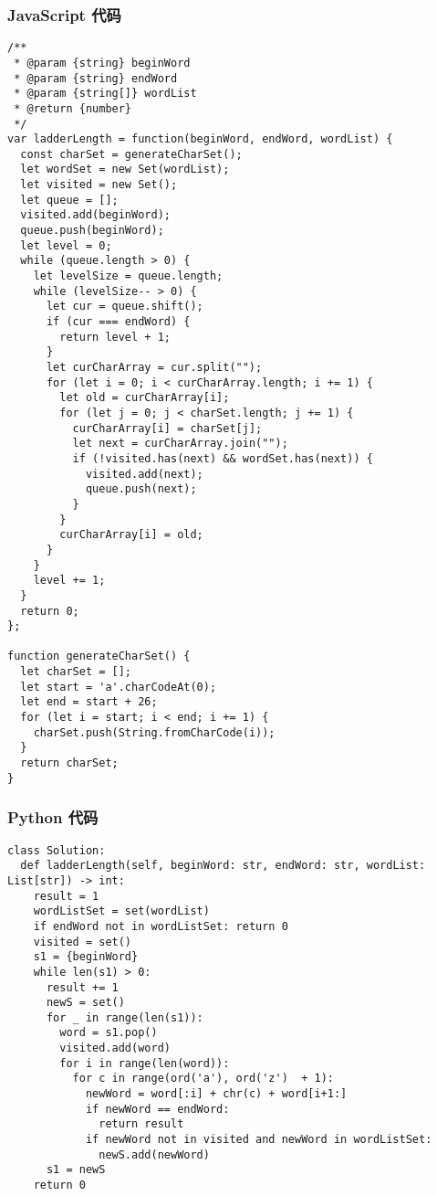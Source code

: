 \subsubsection{JavaScript 代码}

\begin{verbatim}
/**
 * @param {string} beginWord
 * @param {string} endWord
 * @param {string[]} wordList
 * @return {number}
 */
var ladderLength = function(beginWord, endWord, wordList) {
  const charSet = generateCharSet();
  let wordSet = new Set(wordList);
  let visited = new Set();
  let queue = [];
  visited.add(beginWord);
  queue.push(beginWord);
  let level = 0;
  while (queue.length > 0) {
    let levelSize = queue.length;
    while (levelSize-- > 0) {
      let cur = queue.shift();
      if (cur === endWord) {
        return level + 1;
      }
      let curCharArray = cur.split("");
      for (let i = 0; i < curCharArray.length; i += 1) {
        let old = curCharArray[i];
        for (let j = 0; j < charSet.length; j += 1) {
          curCharArray[i] = charSet[j];
          let next = curCharArray.join("");
          if (!visited.has(next) && wordSet.has(next)) {
            visited.add(next);
            queue.push(next);
          }
        }
        curCharArray[i] = old;
      }
    }
    level += 1;
  }
  return 0;
};

function generateCharSet() {
  let charSet = [];
  let start = 'a'.charCodeAt(0);
  let end = start + 26;
  for (let i = start; i < end; i += 1) {
    charSet.push(String.fromCharCode(i));
  }
  return charSet;
}
\end{verbatim}

\subsubsection{Python 代码}

\begin{verbatim}
class Solution:
  def ladderLength(self, beginWord: str, endWord: str, wordList: List[str]) -> int:
    result = 1
    wordListSet = set(wordList)
    if endWord not in wordListSet: return 0
    visited = set()
    s1 = {beginWord}
    while len(s1) > 0:
      result += 1
      newS = set()
      for _ in range(len(s1)):
        word = s1.pop()
        visited.add(word)
        for i in range(len(word)):
          for c in range(ord('a'), ord('z')  + 1):
            newWord = word[:i] + chr(c) + word[i+1:]
            if newWord == endWord:
              return result
            if newWord not in visited and newWord in wordListSet:
              newS.add(newWord)
      s1 = newS
    return 0
\end{verbatim}

